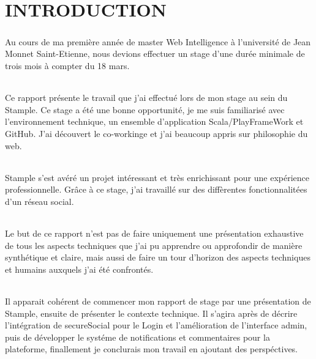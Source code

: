 \chapter{INTRODUCTION}
\paragraph{}
Au cours de ma première année de master Web Intelligence à l'université de Jean Monnet Saint-Etienne, nous devions effectuer un stage d'une durée minimale de trois mois à compter du 18 mars.
\subparagraph{}
Ce rapport présente le travail que j'ai effectué lors de mon stage au sein du Stample.
\newline
Ce stage a été une bonne opportunité, je me suis familiarisé avec l'environnement technique, un ensemble d'application Scala/PlayFrameWork et GitHub.
J'ai découvert le co-workinge et j'ai beaucoup appris sur philosophie du web.
\subparagraph{}
Stample s'est avéré un projet intéressant et très enrichissant pour une expérience professionnelle. Gr\^ace à ce stage, j'ai travaillé sur des diffèrentes fonctionnalitées d'un réseau social.
\subparagraph{}
Le but de ce rapport n’est pas de faire uniquement une présentation exhaustive de tous les aspects techniques que j’ai pu apprendre ou approfondir de manière synthétique et claire, mais aussi de faire un tour d’horizon des aspects techniques et humains auxquels j’ai été confrontés.
\subparagraph{}
Il apparait cohérent de commencer mon rapport de stage par une présentation de Stample, ensuite de présenter le contexte technique. Il s’agira après de décrire l'intégration de secureSocial pour le Login et l'amélioration de l'interface admin, puis de développer le systéme de notifications et commentaires pour la plateforme, finallement je conclurais mon travail en ajoutant des perspéctives.
\newpage